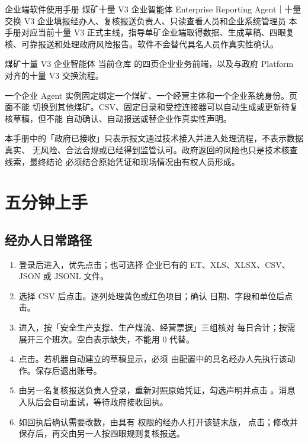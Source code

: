\documentclass[UTF8,openany,zihao=-4,fontset=none]{ctexbook}
\begin{document}
\MakeManualCover
  {企业端软件使用手册}
  {煤矿十量 V3 企业智能体}
  {Enterprise Reporting Agent｜十量交换 V3}
  {企业填报经办人、复核报送负责人、只读查看人员和企业系统管理员}
  {本手册对应当前十量 V3 正式主线，指导单矿企业端取得数据、生成草稿、四眼复核、可靠报送和处理政府风险报告。软件不会替代具名人员作真实性确认。}

\DocumentControl
  {煤矿十量 V3 企业智能体}
  {当前仓库  的四页企业业务前端，以及与政府 Platform 对齐的十量 V3 交换流程。}

\begin{importantbox}
一个企业 Agent 实例固定绑定一个煤矿、一个经营主体和一个企业系统身份。页面不能
切换到其他煤矿。CSV、固定目录和受控连接器可以自动生成或更新待复核草稿，但不能
自动确认、自动报送或替企业作真实性声明。
\end{importantbox}

\begin{warningbox}
本手册中的「政府已接收」只表示报文通过技术接入并进入处理流程，不表示数据真实、
无风险、合法合规或已经得到监管认可。政府返回的风险也只是技术核查线索，最终结论
必须结合原始凭证和现场情况由有权人员形成。
\end{warningbox}

\tableofcontents
\clearpage

\chapter{五分钟上手}

\section{经办人日常路径}

\begin{enumerate}
  \item 登录后进入，优先点击；也可选择
  企业已有的 ET、XLS、XLSX、CSV、JSON 或 JSONL 文件。
  \item 选择 CSV 后点击。逐列处理黄色或红色项目；确认
  日期、字段和单位后点击。
  \item 进入，按「安全生产支撑、生产煤流、经营票据」三组核对
  每日合计；按需展开三个班次。空白表示缺失，不能用 0 代替。
  \item 点击。若机器自动建立的草稿显示，必须
  由配置中的具名经办人先执行该动作。保存后退出账号。
  \item 由另一名复核报送负责人登录，重新对照原始凭证，勾选声明并点击
  。消息入队后会自动重试，等待政府接收回执。
  \item 如回执后确认需要改数，由具有  权限的经办人打开该链末版，
  点击；修改并保存后，再交由另一人按四眼规则复核报送。
\end{enumerate}
\end{document}
